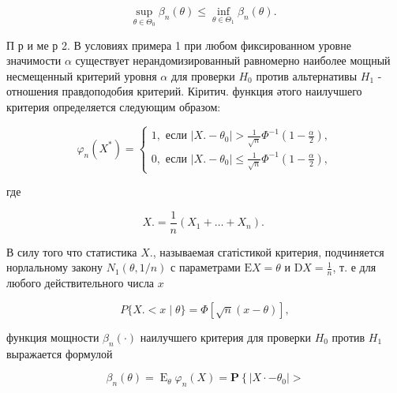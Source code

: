 \documentclass[10pt]{article}
\begin{document}
\[

\sup _{\theta \in \Theta_{0}} \beta_{n}(\theta) \leqslant \inf _{\theta \in \Theta_{1}} \beta_{n}(\theta) \text {. }

\]



П р и ме р 2. В условиях примера 1 при любом фиксированном уровне значимости $\alpha$ существует нерандомизированный равномерно наиболее мощный несмещенный критерий уровня $\alpha$ для проверки $H_{0}$ против альтернативы $H_{1}$ - отношения правдоподобия критерий. Кіритич. функция әтого наилучшего критерия определяется следующим образом:



\[

\varphi_{n}\left(X^{*}\right)=\left\{\begin{array}{l}

1, \text { если }\left|X .-\theta_{0}\right|>\frac{1}{\sqrt{n}} \Phi^{-1}\left(1-\frac{\alpha}{2}\right), \\

0, \text { если }\left|X .-\theta_{0}\right| \leqslant \frac{1}{\sqrt{n}} \Phi^{-1}\left(1-\frac{\alpha}{2}\right),

\end{array}\right.

\]



где



\[

X .=\frac{1}{n}\left(X_{1}+\ldots+X_{n}\right) \text {. }

\]



В силу того что статистика $X$., называемая сгатістикой критерия, подчиняется норлальному закону $N_{1}(\theta, 1 / n)$ с параметрами $\mathrm{E} X=\theta$ и $\mathrm{D} X=\frac{1}{n}$, т. е для любого действительного числа $x$



\[

P\{X .<x \mid \theta\}=\Phi[\sqrt{n}(x-\theta)],

\]



функция мощности $\beta_{n}(\cdot)$ наилучшего критерия для проверки $H_{0}$ против $H_{1}$ выражается формулой



\[

\beta_{n}(\theta)=\operatorname{E}_{\theta} \varphi_{n}(X)=\mathbf{P}\left\{\left|X \cdot-\theta_{0}\right|>\right.

\]
\end{document}
